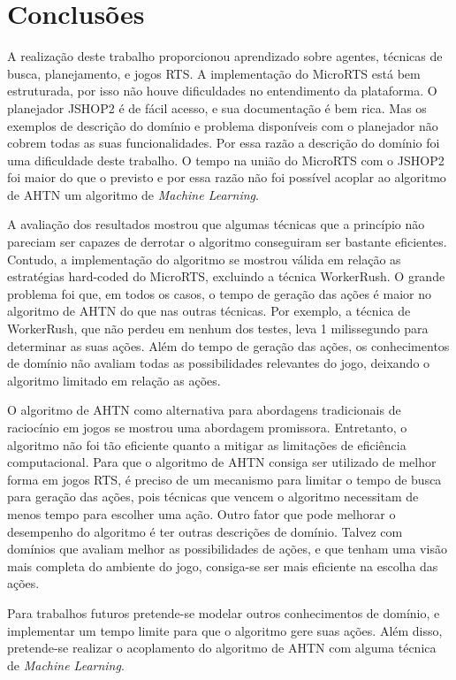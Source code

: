 
\chapter{\label{chap:concl}Conclusões}

A realização deste trabalho proporcionou aprendizado sobre agentes, técnicas de busca, planejamento, e jogos RTS.
A implementação do MicroRTS está bem estruturada, por isso não houve dificuldades no entendimento da plataforma.
O planejador JSHOP2 é de fácil acesso, e sua documentação é bem rica.
Mas os exemplos de descrição do domínio e problema disponíveis com o planejador não cobrem todas as suas funcionalidades.
Por essa razão a descrição do domínio foi uma dificuldade deste trabalho.
O tempo na união do MicroRTS com o JSHOP2 foi maior do que o previsto e por essa razão não foi possível acoplar ao algoritmo de AHTN um algoritmo de \textit{Machine Learning}.

A avaliação dos resultados mostrou que algumas técnicas que a princípio não pareciam ser capazes de derrotar o algoritmo conseguiram ser bastante eficientes.
Contudo, a implementação do algoritmo se mostrou válida em relação as estratégias hard-coded do MicroRTS, excluindo a técnica WorkerRush.
O grande problema foi que, em todos os casos, o tempo de geração das ações é maior no algoritmo de AHTN do que nas outras técnicas.
Por exemplo, a técnica de WorkerRush, que não perdeu em nenhum dos testes, leva 1 milissegundo para determinar as suas ações.
Além do tempo de geração das ações, os conhecimentos de domínio não avaliam todas as possibilidades relevantes do jogo, deixando o algoritmo limitado em relação as ações.

O algoritmo de AHTN como alternativa para abordagens tradicionais de raciocínio em jogos se mostrou uma abordagem promissora. 
Entretanto, o algoritmo não foi tão eficiente quanto a mitigar as limitações de eficiência computacional.
Para que o algoritmo de AHTN consiga ser utilizado de melhor forma em jogos RTS, é preciso de um mecanismo para limitar o tempo de busca para geração das ações, pois técnicas que vencem o algoritmo necessitam de menos tempo para escolher uma ação.
Outro fator que pode melhorar o desempenho do algoritmo é ter outras descrições de domínio.
Talvez com domínios que avaliam melhor as possibilidades de ações, e que tenham uma visão mais completa do ambiente do jogo, consiga-se ser mais eficiente na escolha das ações. 

Para trabalhos futuros pretende-se modelar outros conhecimentos de domínio, e implementar um tempo limite para que o algoritmo gere suas ações. 
Além disso, pretende-se realizar o acoplamento do algoritmo de AHTN com alguma técnica de \textit{Machine Learning}.
